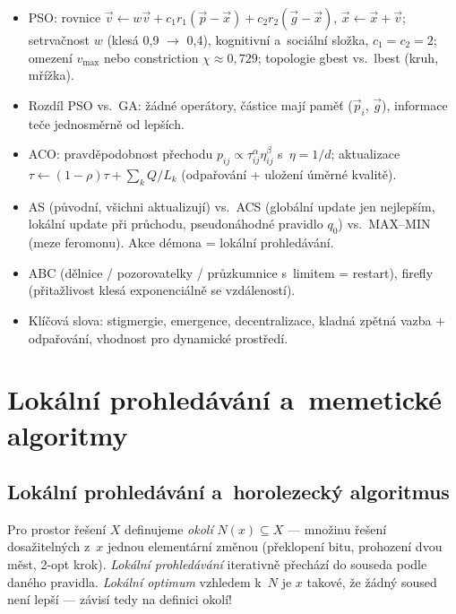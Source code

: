 \documentclass[11pt,a4paper]{article}
\theoremstyle{definition}
\begin{document}
\begin{itemize}
\item PSO: rovnice
  $\vec v \gets w\vec v + c_1r_1(\vec p - \vec x) + c_2r_2(\vec g - \vec x)$,
  $\vec x \gets \vec x + \vec v$; setrvačnost $w$ (klesá 0{,}9 $\to$ 0{,}4),
  kognitivní a~sociální složka, $c_1=c_2=2$; omezení $v_{\max}$ nebo
  constriction $\chi \approx 0{,}729$; topologie gbest vs.\ lbest (kruh,
  mřížka).
\item Rozdíl PSO vs.\ GA: žádné operátory, částice mají paměť
  ($\vec p_i$, $\vec g$), informace teče jednosměrně od lepších.
\item ACO: pravděpodobnost přechodu
  $p_{ij} \propto \tau_{ij}^{\alpha}\eta_{ij}^{\beta}$ s~$\eta = 1/d$;
  aktualizace $\tau \gets (1-\rho)\tau + \sum_k Q/L_k$ (odpařování + uložení
  úměrné kvalitě).
\item AS (původní, všichni aktualizují) vs.\ ACS (globální update jen
  nejlepším, lokální update při průchodu, pseudonáhodné pravidlo $q_0$)
  vs.\ MAX--MIN (meze feromonu). Akce démona = lokální prohledávání.
\item ABC (dělnice / pozorovatelky / průzkumnice s~limitem = restart),
  firefly (přitažlivost klesá exponenciálně se vzdáleností).
\item Klíčová slova: stigmergie, emergence, decentralizace, kladná zpětná
  vazba + odpařování, vhodnost pro dynamické prostředí.
\end{itemize}

\section{Lokální prohledávání a~memetické algoritmy}
\label{sec:lokalni}

\subsection{Lokální prohledávání a~horolezecký algoritmus}

\begin{defbox}
Pro prostor řešení $X$ definujeme \emph{okolí} $N(x) \subseteq X$ --- množinu
řešení dosažitelných z~$x$ jednou elementární změnou (překlopení bitu, prohození
dvou měst, 2-opt krok). \emph{Lokální prohledávání} iterativně přechází
do souseda podle daného pravidla. \emph{Lokální optimum} vzhledem k~$N$ je
$x$ takové, že žádný soused není lepší --- závisí tedy na definici okolí!
\end{defbox}
\end{document}
